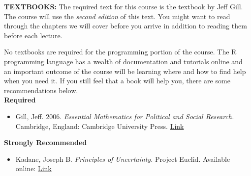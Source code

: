 \documentclass[12pt,a4paper]{article}
\begin{document}
\textbf{TEXTBOOKS:} The required text for this course is the textbook by Jeff Gill. The course will use the \textit{second edition} of this text. You might want to read through the chapters we will cover before you arrive in addition to reading them before each lecture.

No textbooks are required for the programming portion of the course.  The R programming language has a wealth of documentation and tutorials online and an important outcome of the course will be learning where and how to find help when you need it.  If you still feel that a book will help you, there are some recommendations below.\\

\textbf{Required}
\begin{itemize}
\item Gill, Jeff. 2006. \textit{Essential Mathematics for Political and Social Research.} Cambridge, England: Cambridge University Press. \href{http://www.amazon.com/Essential-Mathematics-Political-Research-Analytical/dp/052168403X/ref=sr_1_1?ie=UTF8&qid=1304604787&sr=8-1}{Link}
\end{itemize}

\textbf{Strongly Recommended}

\begin{itemize}
\item Kadane, Joseph B.  \textit{Principles of Uncertainty.} Project Euclid. Available online: \href{http://uncertainty.stat.cmu.edu/}{Link}

\end{itemize}
\end{document}
